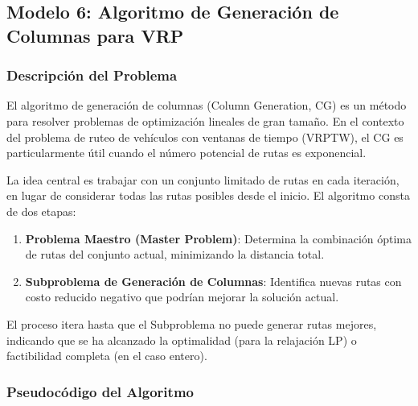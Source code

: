 \documentclass[12pt]{article}
\begin{document}
\subsection{Modelo 6: Algoritmo de Generación de Columnas para VRP}

\subsubsection{Descripción del Problema}

El algoritmo de generación de columnas (Column Generation, CG) es un método para resolver problemas de optimización lineales de gran tamaño. En el contexto del problema de ruteo de vehículos con ventanas de tiempo (VRPTW), el CG es particularmente útil cuando el número potencial de rutas es exponencial. 

La idea central es trabajar con un conjunto limitado de rutas en cada iteración, en lugar de considerar todas las rutas posibles desde el inicio. El algoritmo consta de dos etapas:

\begin{enumerate}
    \item \textbf{Problema Maestro (Master Problem)}: Determina la combinación óptima de rutas del conjunto actual, minimizando la distancia total.
    \item \textbf{Subproblema de Generación de Columnas}: Identifica nuevas rutas con costo reducido negativo que podrían mejorar la solución actual.
\end{enumerate}

El proceso itera hasta que el Subproblema no puede generar rutas mejores, indicando que se ha alcanzado la optimalidad (para la relajación LP) o factibilidad completa (en el caso entero).

\subsubsection{Pseudocódigo del Algoritmo}
\end{document}
